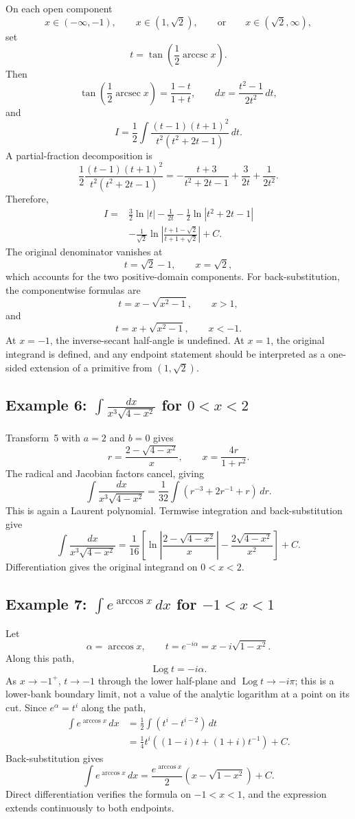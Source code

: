 \documentclass[11pt]{article}
\theoremstyle{remark}
\DeclareMathOperator{\Logop}{Log}
\DeclareMathOperator{\arccsc}{arccsc}
\DeclareMathOperator{\arcsec}{arcsec}
\begin{document}
On each open component
\[
x\in(-\infty,-1),
\qquad
x\in(1,\sqrt2),
\qquad\text{or}\qquad
x\in(\sqrt2,\infty),
\]
set
\[
t=\tan\!\left(\frac{1}{2}\arccsc x\right).
\]
Then
\[
\tan\!\left(\frac{1}{2}\arcsec x\right)=\frac{1-t}{1+t},
\qquad
dx=\frac{t^2-1}{2t^2}\,dt,
\]
and
\[
I=\frac{1}{2}\int\frac{(t-1)(t+1)^2}{t^2(t^2+2t-1)}\,dt.
\]
A partial-fraction decomposition is
\[
\frac{1}{2}\frac{(t-1)(t+1)^2}{t^2(t^2+2t-1)}
=-\frac{t+3}{t^2+2t-1}+\frac{3}{2t}+\frac{1}{2t^2}.
\]
Therefore,
\begin{align*}
I={}&\frac{3}{2}\ln|t|-\frac{1}{2t}
-\frac{1}{2}\ln|t^2+2t-1|\\
&-\frac{1}{\sqrt2}\ln\left|\frac{t+1-\sqrt2}{t+1+\sqrt2}\right|+C.
\end{align*}
The original denominator vanishes at
\[
t=\sqrt2-1,
\qquad x=\sqrt2,
\]
which accounts for the two positive-domain components. For back-substitution, the componentwise formulas are
\[
t=x-\sqrt{x^2-1},\qquad x>1,
\]
and
\[
t=x+\sqrt{x^2-1},\qquad x<-1.
\]
At $x=-1$, the inverse-secant half-angle is undefined. At $x=1$, the original integrand is defined, and any endpoint statement should be interpreted as a one-sided extension of a primitive from $(1,\sqrt2)$.

\subsection*{Example 6: $\displaystyle\int\frac{dx}{x^3\sqrt{4-x^2}}$ for $0<x<2$}

Transform~5 with $a=2$ and $b=0$ gives
\[
r=\frac{2-\sqrt{4-x^2}}{x},
\qquad
x=\frac{4r}{1+r^2}.
\]
The radical and Jacobian factors cancel, giving
\[
\int\frac{dx}{x^3\sqrt{4-x^2}}
=\frac{1}{32}\int\left(r^{-3}+2r^{-1}+r\right)\,dr.
\]
This is again a Laurent polynomial. Termwise integration and back-substitution give
\[
\int\frac{dx}{x^3\sqrt{4-x^2}}
=\frac{1}{16}\left[
\ln\left|\frac{2-\sqrt{4-x^2}}{x}\right|
-\frac{2\sqrt{4-x^2}}{x^2}
\right]+C.
\]
Differentiation gives the original integrand on $0<x<2$.

\subsection*{Example 7: $\displaystyle\int e^{\arccos x}\,dx$ for $-1<x<1$}

Let
\[
\alpha=\arccos x,
\qquad
t=e^{-i\alpha}=x-i\sqrt{1-x^2}.
\]
Along this path,
\[
\Logop t=-i\alpha.
\]
As $x\to-1^+$, $t\to-1$ through the lower half-plane and $\Logop t\to-i\pi$; this is a lower-bank boundary limit, not a value of the analytic logarithm at a point on its cut. Since $e^\alpha=t^i$ along the path,
\begin{align*}
\int e^{\arccos x}\,dx
&=\frac{1}{2}\int\left(t^i-t^{i-2}\right)\,dt\\
&=\frac{1}{4}t^i\left((1-i)t+(1+i)t^{-1}\right)+C.
\end{align*}
Back-substitution gives
\[
\int e^{\arccos x}\,dx
=\frac{e^{\arccos x}}{2}\left(x-\sqrt{1-x^2}\right)+C.
\]
Direct differentiation verifies the formula on $-1<x<1$, and the expression extends continuously to both endpoints.
\end{document}
